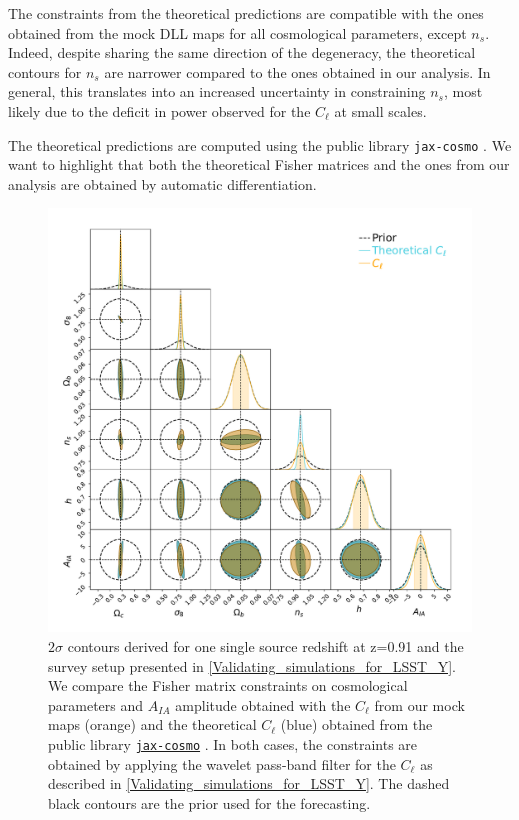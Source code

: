 \documentclass[twocolumn,twocolappendix]{aastex63}
\begin{document}
The constraints from the theoretical predictions
are compatible with the ones obtained from the mock DLL maps for all cosmological parameters, except $n_s$. Indeed, despite sharing the same direction of the degeneracy, the theoretical contours for $n_s$ are narrower compared to the ones obtained in our analysis. In general, this translates into an increased uncertainty in constraining $n_s$, most likely due to the deficit in power observed for the $C_{\ell}$ at small scales. 

The theoretical predictions are computed using the public library \texttt{jax-cosmo} \citep{Campagne_2023}. 
We want to highlight that both the theoretical Fisher matrices and the ones from our analysis are obtained by automatic differentiation.


\renewcommand{\thefigure}{A\arabic{figure}}
\setcounter{figure}{0}
 \begin{figure}
    \centering
    \includegraphics[width=\textwidth]{paper/figures/Fisher_IA_theory_n.pdf}
    \caption{ $2\sigma$ contours derived for one single source redshift at z=0.91 and the survey setup presented in \autoref{Validating_simulations_for_LSST_Y}.
    We compare the Fisher matrix constraints on cosmological parameters and $A_{IA}$ amplitude obtained with the $C_{\ell}$ from our mock maps (orange) and the theoretical $C_{\ell}$ (blue) obtained from the public library  \href{https://github.com/DifferentiableUniverseInitiative/jax_cosmo}{\texttt{jax-cosmo}} \citep{Campagne_2023}.  
    In both cases, the constraints are obtained by applying  the wavelet pass-band filter for the $C_{\ell}$ as described in \autoref{Validating_simulations_for_LSST_Y}.
The dashed black contours are the prior used for the forecasting.}
     \label{fig:Fisher_result_theory}
\end{figure}
\end{document}
